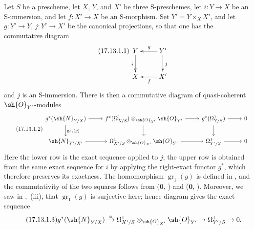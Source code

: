 \begin{env}[17.13.1]
\label{IV.17.13.1}
Let $S$ be a prescheme, let $X$, $Y$, and $X'$ be three S-preschemes, let $i:Y\to X$ be an S-immersion, and let $f:X'\to X$ be an S-morphism.
Set $Y'=Y\times_X X'$, and let $g:Y'\to Y$, $j:Y'\to X'$ be the canonical projections, so that one has the commutative diagram
\[
\label{IV.17.13.1.1}
\tag{17.13.1.1}
\xymatrix{
  Y \ar[d]_i & Y' \ar[l]_g \ar[d]^j\\
  X & X' \ar[l]^f
}
\]
and $j$ is an S-immersion.
There is then a commutative diagram of quasi-coherent $\sh{O}_{Y'}$-modules
\[
\label{IV.17.13.1.2}
\tag{17.13.1.2}
\begin{tikzcd}
  g^*(\sh{N}_{Y/X}) \ar{r} \ar{d}{\operatorname{gr}_1(g)} & f^*(\Omega^1_{X/S})\otimes_{\sh{O}_{X'}} \sh{O}_{Y'} \ar{r} \ar{d} & g^*(\Omega^1_{Y/S}) \ar{r} \ar{d} & 0 \\
  \sh{N}_{Y'/X'} \ar{r} & \Omega^1_{X'/S}\otimes_{\sh{O}_{X'}} \sh{O}_{Y'} \ar{r} & \Omega^1_{Y'/S} \ar{r} & 0
\end{tikzcd}
\]
Here the lower row is the exact sequence  applied to $j$; the upper row is obtained from the same exact sequence for $i$ by applying the right-exact functor $g^*$, which therefore preserves its exactness.
The homomorphism $\operatorname{gr}_1(g)$ is defined in , and the commutativity of the two squares follows from ($\mathbf{0}$, ) and ($\mathbf{0}$, ).
Moreover, we saw in ,~(iii), that $\operatorname{gr}_1(g)$ is surjective here; hence diagram  gives the exact sequence
\[
\label{IV.17.13.1.3}
\tag{17.13.1.3}
  g^*(\sh{N}_{Y/X}) \xrightarrow{\alpha} \Omega^1_{X'/S}\otimes_{\sh{O}_{X'}} \sh{O}_{Y'} \to \Omega^1_{Y'/S} \to 0.
\]
\end{env}

